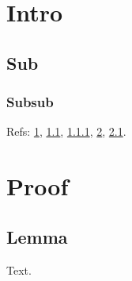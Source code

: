 \documentclass[compsoc,conference]{IEEEtran}
\begin{document}
\section{Intro}\label{s1}
\subsection{Sub}\label{s11}
\subsubsection{Subsub}\label{s111}
Refs: \ref{s1}, \ref{s11}, \ref{s111}, \ref{a1}, \ref{a11}.
\appendices
\section{Proof}\label{a1}
\subsection{Lemma}\label{a11}
Text.
\end{document}
